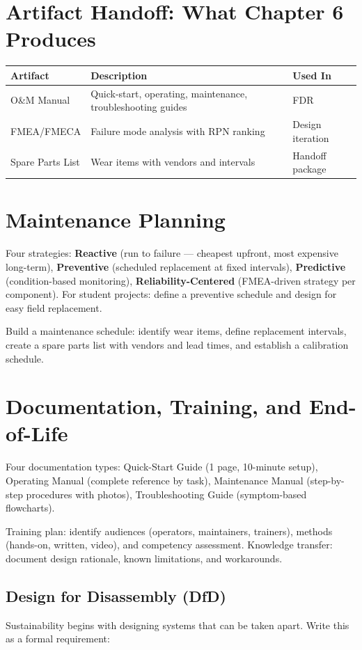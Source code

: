 \documentclass[11pt,letterpaper,twoside,openany]{book}
\begin{document}
\section{Artifact Handoff: What Chapter 6 Produces}
\begin{table}[htbp]\centering\small
\begin{tabularx}{\textwidth}{l X l}
\toprule
\textbf{Artifact} & \textbf{Description} & \textbf{Used In} \\
\midrule
O\&M Manual & Quick-start, operating, maintenance, troubleshooting guides & FDR \\
FMEA/FMECA & Failure mode analysis with RPN ranking & Design iteration \\
Spare Parts List & Wear items with vendors and intervals & Handoff package \\
\bottomrule
\end{tabularx}
\end{table}

\section{Maintenance Planning}
Four strategies: \textbf{Reactive} (run to failure — cheapest upfront, most expensive long-term), \textbf{Preventive} (scheduled replacement at fixed intervals), \textbf{Predictive} (condition-based monitoring), \textbf{Reliability-Centered} (FMEA-driven strategy per component). For student projects: define a preventive schedule and design for easy field replacement.

Build a maintenance schedule: identify wear items, define replacement intervals, create a spare parts list with vendors and lead times, and establish a calibration schedule.

\section{Documentation, Training, and End-of-Life}
Four documentation types: Quick-Start Guide (1 page, 10-minute setup), Operating Manual (complete reference by task), Maintenance Manual (step-by-step procedures with photos), Troubleshooting Guide (symptom-based flowcharts).

Training plan: identify audiences (operators, maintainers, trainers), methods (hands-on, written, video), and competency assessment. Knowledge transfer: document design rationale, known limitations, and workarounds.


\subsection{Design for Disassembly (DfD)}
Sustainability begins with designing systems that can be taken apart. Write this as a formal requirement:
\end{document}

